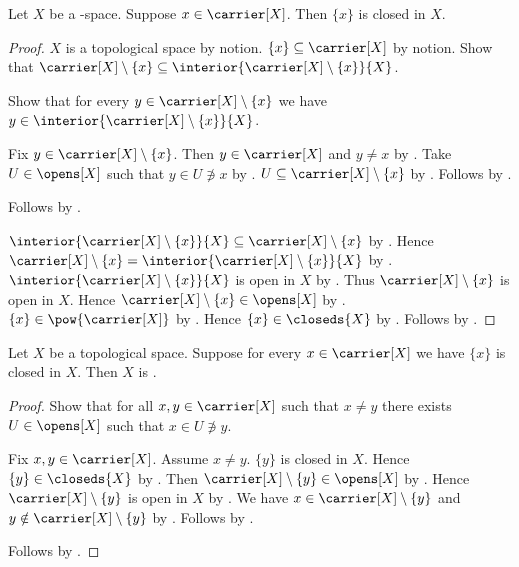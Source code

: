 \begin{proposition}\label{teeone_implies_singletons_closed}
    Let $X$ be a \teeone-space.
    Suppose $x\in\carrier[X]$.
    Then $\{x\}$ is closed in $X$.
\end{proposition}
\begin{proof}
    $X$ is a topological space by notion.
    $\{x\}\subseteq\carrier[X]$ by notion.
    Show that $\carrier[X]\setminus\{x\}
        \subseteq\interior{\carrier[X]\setminus\{x\}}{X}$.
    \begin{subproof}
        Show that for every $y\in\carrier[X]\setminus\{x\}$ we have
            $y\in\interior{\carrier[X]\setminus\{x\}}{X}$.
        \begin{subproof}
            Fix $y\in\carrier[X]\setminus\{x\}$.
            Then $y\in\carrier[X]$ and $y\neq x$
                by .
            Take $U\in\opens[X]$ such that $y\in U\not\ni x$
                by .
            $U\subseteq\carrier[X]\setminus\{x\}$
                by .
            Follows by .
        \end{subproof}
        Follows by .
    \end{subproof}
    $\interior{\carrier[X]\setminus\{x\}}{X}
        \subseteq\carrier[X]\setminus\{x\}$
        by .
    Hence $\carrier[X]\setminus\{x\}
        =\interior{\carrier[X]\setminus\{x\}}{X}$
        by .
    $\interior{\carrier[X]\setminus\{x\}}{X}$ is open in $X$
        by .
    Thus $\carrier[X]\setminus\{x\}$ is open in $X$.
    Hence $\carrier[X]\setminus\{x\}\in\opens[X]$ by .
    $\{x\}\in\pow{\carrier[X]}$ by .
    Hence $\{x\}\in\closeds{X}$ by .
    Follows by .
\end{proof}

\begin{proposition}\label{singletons_closed_implies_teeone}
    Let $X$ be a topological space.
    Suppose for every $x\in\carrier[X]$ we have
        $\{x\}$ is closed in $X$.
    Then $X$ is \teeone.
\end{proposition}
\begin{proof}
    Show that for all $x,y\in\carrier[X]$ such that $x\neq y$
        there exists $U\in\opens[X]$ such that $x\in U\not\ni y$.
    \begin{subproof}
        Fix $x,y\in\carrier[X]$.
        Assume $x\neq y$.
        $\{y\}$ is closed in $X$.
        Hence $\{y\}\in\closeds{X}$ by .
        Then $\carrier[X]\setminus\{y\}\in\opens[X]$ by .
        Hence $\carrier[X]\setminus\{y\}$ is open in $X$ by .
        We have $x\in\carrier[X]\setminus\{y\}$ and
            $y\notin\carrier[X]\setminus\{y\}$
            by .
        Follows by .
    \end{subproof}
    Follows by .
\end{proof}

